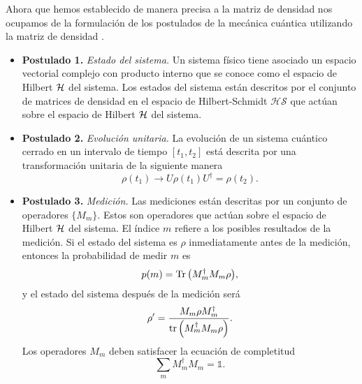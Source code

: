 Ahora que hemos establecido de manera precisa a la matriz de densidad
nos ocupamos de la formulación de los postulados de la mecánica cuántica 
utilizando la matriz de densidad \cite[p.~102]{nielsen_chuang_2011}.
\begin{itemize}
	\item[] \textbf{Postulado 1.} \textit{Estado del sistema.} 
	Un sistema físico tiene asociado un espacio vectorial complejo
	con producto interno que se conoce como el espacio de Hilbert $\mathcal{H}$ del
	sistema. Los estados del sistema están descritos por el conjunto 
	de matrices de densidad en el espacio de Hilbert-Schmidt $\mathcal{HS}$	
	que actúan sobre el espacio de Hilbert $\mathcal{H}$ del sistema. 
	\item[] \textbf{Postulado 2.} \textit{Evolución unitaria.}
	La evolución de un sistema cuántico cerrado en un intervalo 
	de tiempo $[t_1,t_2]$ está descrita 	por una transformación unitaria
	de la siguiente manera 
	\begin{equation} \label{eq:postulate-ClosedEvolution}
	\rho(t_1)\longrightarrow U\rho(t_1) U^{\dagger}=\rho(t_2).
	\end{equation}
	\item[] \textbf{Postulado 3.} \textit{Medición.}
	Las mediciones están descritas por un conjunto de 
	operadores $\{M_m\}$. Estos son operadores que actúan sobre el espacio 
	de Hilbert $\mathcal{H}$ del sistema. El índice $m$ refiere a los posibles
	resultados de la medición. Si el estado del sistema es $\rho$ 
	inmediatamente antes de la medición, entonces la probabilidad
	de medir $m$ es
	\begin{equation} \label{eq:post_MeasureProb}
	p(m)=\Tr \qty(M_m^{\dagger}M_m\rho),
	\end{equation}						
	y el estado del sistema después de la medición será
	\begin{equation} \label{eq:post_MeasureTrasnfState}
	\rho'=\frac{M_m\rho M_m^{\dagger}}{\tr \qty(M_m^{\dagger}M_m\rho)}.
	\end{equation}	
	Los operadores $M_m$ deben satisfacer la ecuación de completitud
	\begin{equation} \label{eq:post_MeasureMCompleteness}
	\sum _m M_m^{\dagger}M_m=\mathbb{1}.
	\end{equation}

\end{itemize}
